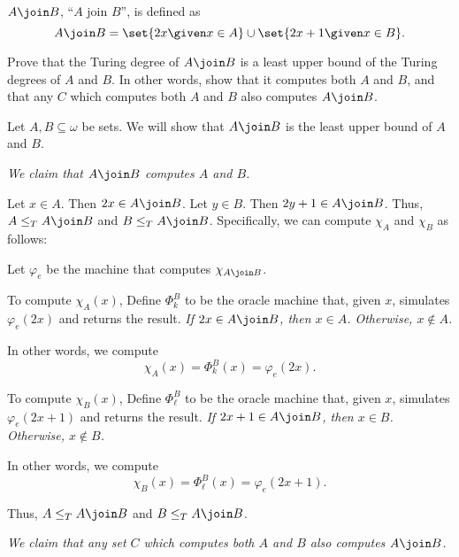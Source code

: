 \begin{problem}
  $A \join B$, ``$A$ join $B$'', is defined as
  \[
    A \join B = \set{ 2x \given x \in A } \cup \set{ 2x+1 \given x \in B }.
  \]

  Prove that the Turing degree of $A \join B$ is a least upper bound
  of the Turing degrees of $A$ and $B$.
  In other words, show that it computes both $A$ and $B$,
  and that any $C$ which computes both $A$ and $B$
  also computes $A \join B$.

  \begin{answer}
    Let $A, B \subseteq \omega$ be sets.
    We will show that $A \join B$ is the least upper bound of $A$ and $B$.
    \begin{enumarabic}
      \item \emph{We claim that $A \join B$ computes $A$ and $B$.}
      
        \step
        Let $x \in A$.
        Then $2x \in A \join B$.
        Let $y \in B$.
        Then $2y+1 \in A \join B$.
        Thus, $A \leq_T A \join B$ and $B \leq_T A \join B$.
        Specifically, we can compute $\chi_A$ and $\chi_B$ as follows:

        \step
        Let $\varphi_e$ be the machine that computes $\chi_{A \join B}$.
        \begin{enumroman}
          \item To compute $\chi_A(x)$, Define $\Phi_k^B$ to be the oracle machine
            that, given $x$, simulates $\varphi_e(2x)$ and returns the result.
            \emph{
              If $2x \in A \join B$, then $x \in A$.
              Otherwise, $x \not\in A$.
            }

            In other words, we compute
            \[
              \chi_A(x) = \Phi_k^B(x) = \varphi_e(2x).
            \]
          \item To compute $\chi_B(x)$, Define $\Phi_\ell^B$ to be the oracle machine
            that, given $x$, simulates $\varphi_e(2x+1)$ and returns the result.
            \emph{
              If $2x+1 \in A \join B$, then $x \in B$.
              Otherwise, $x \not\in B$.
            }

            In other words, we compute
            \[
              \chi_B(x) = \Phi_\ell^B(x) = \varphi_e(2x+1).
            \]

          \end{enumroman}
          Thus, $A \leq_T A \join B$ and $B \leq_T A \join B$.


      \step
      \item \emph{We claim that any set $C$ which computes both $A$ and $B$ also computes $A \join B$.}


\end{enumarabic}
\end{answer}
\end{problem}
